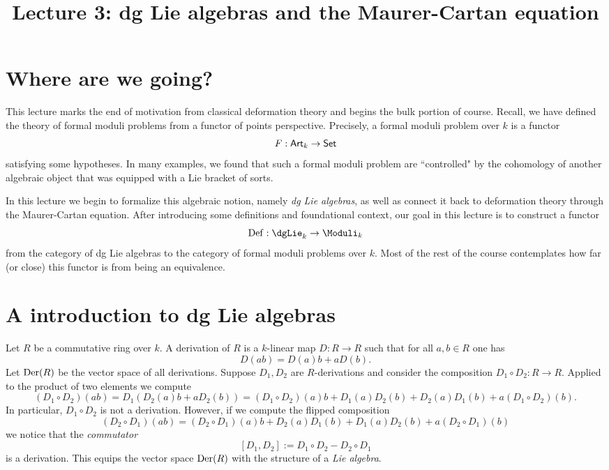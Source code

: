 \documentclass[11pt]{amsart}
\title{Lecture 3: dg Lie algebras and the Maurer-Cartan equation}
\begin{document}
\maketitle

\section{Where are we going?}

This lecture marks the end of motivation from classical deformation theory and begins the bulk portion of course. 
Recall, we have defined the theory of formal moduli problems from a functor of points perspective. 
Precisely, a formal moduli problem over $k$ is a functor
\[
F : {\sf Art}_k \to {\sf Set}
\]
satisfying some hypotheses. 
In many examples, we found that such a formal moduli problem are ``controlled" by the cohomology of another algebraic object that was equipped with a Lie bracket of sorts. 

In this lecture we begin to formalize this algebraic notion, namely {\em dg Lie algebras}, as well as connect it back to deformation theory through the Maurer-Cartan equation. 
After introducing some definitions and foundational context, our goal in this lecture is to construct a functor
\[
\Def : \dgLie_k \to \Moduli_k
\]
from the category of dg Lie algebras to the category of formal moduli problems over $k$. 
Most of the rest of the course contemplates how far (or close) this functor is from being an equivalence.

\section{A introduction to dg Lie algebras}


Let $R$ be a commutative ring over $k$. 
A derivation of $R$ is a $k$-linear map $D : R \to R$ such that for all $a,b \in R$ one has
\[
D(ab) = D(a) b + a D(b) .
\] 
Let ${\rm Der}(R)$ be the vector space of all derivations.
Suppose $D_1,D_2$ are $R$-derivations and consider the composition $D_1 \circ D_2 : R \to R$. 
Applied to the product of two elements we compute
\[
(D_1 \circ D_2) (ab) = D_1(D_2(a) b + a D_2(b)) = (D_1 \circ D_2)(a) b + D_1(a) D_2(b) + D_2(a) D_1(b) + a (D_1 \circ D_2)(b) .
\] 
In particular, $D_1 \circ D_2$ is not a derivation. 
However, if we compute the flipped composition
\[
(D_2 \circ D_1) (ab) = (D_2 \circ D_1)(a) b + D_2(a) D_1(b) + D_1(a) D_2(b) + a (D_2 \circ D_1)(b)
\]
we notice that the {\em commutator}
\[
[D_1, D_2] := D_1 \circ D_2 - D_2 \circ D_1
\]
is a derivation. 
This equips the vector space ${\rm Der}(R)$ with the structure of a {\em Lie algebra}. 
\end{document}

